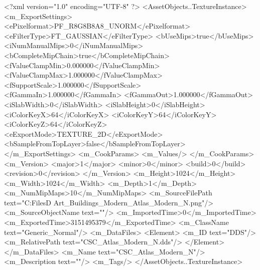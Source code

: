 <?xml version="1.0" encoding="UTF-8" ?>
<AssetObjects..TextureInstance>
	<m_ExportSettings>
		<ePixelformat>PF_R8G8B8A8_UNORM</ePixelformat>
		<eFilterType>FT_GAUSSIAN</eFilterType>
		<bUseMips>true</bUseMips>
		<iNumManualMips>0</iNumManualMips>
		<bCompleteMipChain>true</bCompleteMipChain>
		<fValueClampMin>0.000000</fValueClampMin>
		<fValueClampMax>1.000000</fValueClampMax>
		<fSupportScale>1.000000</fSupportScale>
		<fGammaIn>1.000000</fGammaIn>
		<fGammaOut>1.000000</fGammaOut>
		<iSlabWidth>0</iSlabWidth>
		<iSlabHeight>0</iSlabHeight>
		<iColorKeyX>64</iColorKeyX>
		<iColorKeyY>64</iColorKeyY>
		<iColorKeyZ>64</iColorKeyZ>
		<eExportMode>TEXTURE_2D</eExportMode>
		<bSampleFromTopLayer>false</bSampleFromTopLayer>
	</m_ExportSettings>
	<m_CookParams>
		<m_Values/>
	</m_CookParams>
	<m_Version>
		<major>1</major>
		<minor>0</minor>
		<build>0</build>
		<revision>0</revision>
	</m_Version>
	<m_Height>1024</m_Height>
	<m_Width>1024</m_Width>
	<m_Depth>1</m_Depth>
	<m_NumMipMaps>10</m_NumMipMaps>
	<m_SourceFilePath text="C:\Users\Shadow\Desktop\Working Files\3D Art\Textures\CSC_Buildings_Modern\Current\textures\CSC_Atlas_Modern_N.png"/>
	<m_SourceObjectName text=""/>
	<m_ImportedTime>0</m_ImportedTime>
	<m_ExportedTime>3151495379</m_ExportedTime>
	<m_ClassName text="Generic_Normal"/>
	<m_DataFiles>
		<Element>
			<m_ID text="DDS"/>
			<m_RelativePath text="CSC_Atlas_Modern_N.dds"/>
		</Element>
	</m_DataFiles>
	<m_Name text="CSC_Atlas_Modern_N"/>
	<m_Description text=""/>
	<m_Tags/>
</AssetObjects..TextureInstance>


